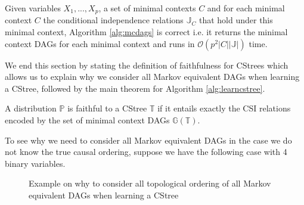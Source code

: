 \documentclass{tufte-book}
\begin{document}
\begin{theorem}\label{thm:mcdagscorrectness}
Given variables $X_1,...,X_p$, a set of minimal contexts $C$ and for each minimal context $C$ the conditional independence relations $\mathbb{J}_C$ that hold under this minimal context, Algorithm \ref{alg:mcdags} is correct i.e. it returns the minimal context DAGs for each minimal context and runs in $\mathcal{O}(p^2 |C||\mathbb{J}|)$ time.
\end{theorem}





We end this section by stating the definition of faithfulness for CStrees which allows us to explain why we consider all Markov equivalent DAGs when learning a CStree, followed by the main theorem for Algorithm \ref{alg:learncstree}.

\begin{definition}\label{def:faithfulnesscstrees}
A distribution $\mathbb{P}$ is faithful to a CStree $\mathbb{T}$ if it entails exactly the CSI relations encoded by the set of minimal context DAGs $\mathbb{G}(\mathbb{T})$.
\end{definition}

To see why we need to consider all Markov equivalent DAGs in the case we do not know the true causal ordering, suppose we have the following case with 4 binary variables.


\begin{figure}[!h]\label{fig:dagtocstree_cstree}
   \begin{floatrow}
%
\caption{Example on why to consider all topological ordering of all Markov equivalent DAGs when learning a CStree}
        
   \end{floatrow}
\end{figure}
\end{document}
